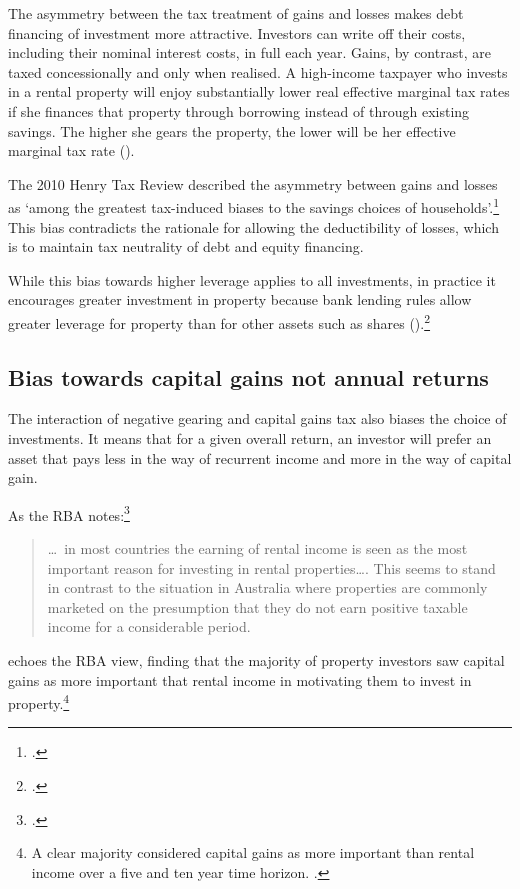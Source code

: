 \documentclass{grattanAlpha}\usepackage[]{graphicx}\usepackage[]{color}
\begin{document}
The asymmetry between the tax treatment of gains and losses makes debt financing of investment more attractive. Investors can write off their costs, including their nominal interest costs, in full each year. 
Gains, by contrast, are taxed concessionally and only when realised. 
A high-income taxpayer who invests in a rental property will enjoy substantially lower real effective marginal tax rates if she finances that property through borrowing instead of through existing savings. The higher she gears the property, the lower will be her effective marginal tax rate (). 

The 2010 Henry Tax Review described the asymmetry between gains and losses as ‘among the greatest tax-induced biases to the savings choices of households’.\footcite[][69]{HenryTaxReview2010} This bias contradicts the rationale for allowing the deductibility of losses, which is to maintain tax neutrality of debt and equity financing.

While this bias towards higher leverage applies to all investments, in practice it encourages greater investment in property because bank lending rules allow greater leverage for property than for other assets such as shares ().\footcite[][23]{RBA2015SubmissionHomeOwnershipInquiry}  


\subsection{Bias towards capital gains not annual returns}
The interaction of negative gearing and capital gains tax also biases the choice of investments. It means that for a given overall return, an investor will prefer an asset that pays less in the way of recurrent income and more in the way of capital gain.

As the RBA notes:\footcite[][42]{RBA2014SubmissionAffordableHousingInquiry}
\begin{quote}
\dots\ in most countries the earning of rental income is seen as the most important reason for investing in rental properties\dots. This seems to stand in contrast to the situation in Australia where properties are commonly marketed on the presumption that they do not earn positive taxable income for a considerable period.
\end{quote}
\textcite{seelig2009understanding} echoes the RBA view, finding that the majority of property investors saw capital gains as more important that rental income in motivating them to invest in property.\footnote{A clear majority considered capital gains as more important than rental income over a five and ten year time horizon. \textcite[][63]{seelig2009understanding}.}
\end{document}
